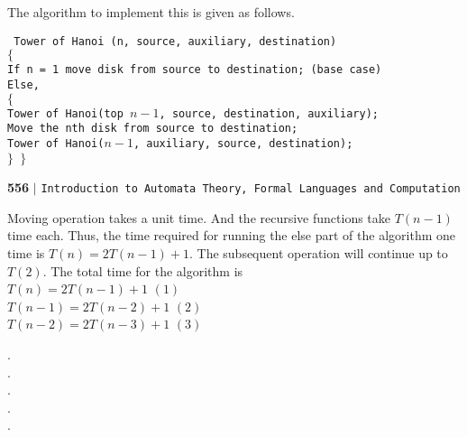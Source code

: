 \documentclass[12pt]{article}
\begin{document}
\vspace*{0.2cm}
The algorithm to implement this is given as follows.\\
\vspace*{0.1cm}

\small{
\texttt{
\hspace*{1cm} Tower of Hanoi (n, source, auxiliary, destination)\\
\hspace*{1.5cm} $\{$ \\
\hspace*{2cm} If n = 1 move disk from source to destination; (base case)\\
\hspace*{2cm} Else,\\
\hspace*{2.5cm} $\{$ \\
\hspace*{3cm}  Tower of Hanoi(top $n - 1$, source, destination, auxiliary);\\
\hspace*{3cm} Move the nth disk from source to destination;\\
\hspace*{3cm} Tower of Hanoi($n - 1$, auxiliary, source, destination);\\
\hspace*{2.5cm} $\}$
\hspace*{1.5cm} $\}$
}
}

\newpage
\begin{flushleft}
    \textbf{556}\hspace*{0.1cm} \textbf{$|$} \hspace*{0.1cm} \texttt{Introduction to Automata Theory, Formal Languages and Computation}
  \end{flushleft}

\vspace*{0.5cm}
\hspace*{0.5cm} Moving operation takes a unit time. And the recursive functions take $T(n - 1)$ time each. Thus, the
time required for running the else part of the algorithm one time is $T(n) = 2T(n - 1) + 1 $. The subsequent
operation will continue up to $T(2)$. The total time for the algorithm is\\


\hspace*{4cm} $T(n) = 2T(n - 1) + 1$   \hspace*{3cm} $(1)$ \\
\hspace*{3.5cm} $T(n - 1) = 2T(n - 2) + 1$   \hspace*{3cm} $(2)$ \\
\hspace*{3.5cm} $T(n - 2) = 2T(n - 3) + 1$   \hspace*{3cm} $(3)$ \\
\begin{center}
  . \\
  . \\
  . \\
  . \\
  . \\
\end{center}
\end{document}

